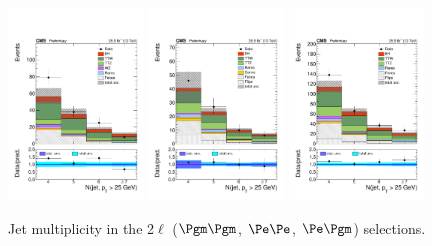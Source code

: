 \begin{figure}[htb]
	\centering 
\includegraphics[width=0.32\textwidth]{plots_leptons/lep_evtsel/2lss_SR/mm/2lep_nJet25_from4.pdf}
\includegraphics[width=0.32\textwidth]{plots_leptons/lep_evtsel/2lss_SR/ee/2lep_nJet25_from4.pdf}
\includegraphics[width=0.32\textwidth]{plots_leptons/lep_evtsel/2lss_SR/em/2lep_nJet25_from4.pdf}
	\caption{Jet multiplicity in the 2$\ell$ ($\Pgm\Pgm$, $\Pe\Pe$, $\Pe\Pgm$) selections.}
	\label{fig:2l_nJet}
\end{figure}

